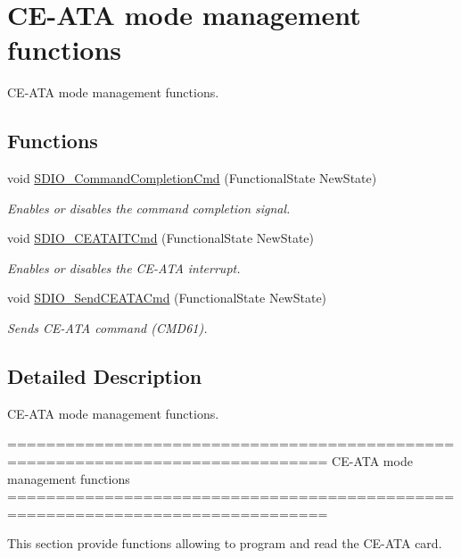 \hypertarget{group___s_d_i_o___group5}{}\section{C\+E-\/\+A\+T\+A mode management functions}
\label{group___s_d_i_o___group5}


C\+E-\/\+A\+T\+A mode management functions.  


\subsection*{Functions}
\begin{DoxyCompactItemize}
\item 
void \hyperlink{group___s_d_i_o___group5_ga1bbe98c629812bc62121d9c8b2c5e21b}{S\+D\+I\+O\+\_\+\+Command\+Completion\+Cmd} (Functional\+State New\+State)
\begin{DoxyCompactList}\small\item\em Enables or disables the command completion signal. \end{DoxyCompactList}\item 
void \hyperlink{group___s_d_i_o___group5_gab44b8cbc21be000a291563076159503b}{S\+D\+I\+O\+\_\+\+C\+E\+A\+T\+A\+I\+T\+Cmd} (Functional\+State New\+State)
\begin{DoxyCompactList}\small\item\em Enables or disables the C\+E-\/\+A\+T\+A interrupt. \end{DoxyCompactList}\item 
void \hyperlink{group___s_d_i_o___group5_ga8dc7f17804bdb745b42f6647c8487b4c}{S\+D\+I\+O\+\_\+\+Send\+C\+E\+A\+T\+A\+Cmd} (Functional\+State New\+State)
\begin{DoxyCompactList}\small\item\em Sends C\+E-\/\+A\+T\+A command (C\+M\+D61). \end{DoxyCompactList}\end{DoxyCompactItemize}


\subsection{Detailed Description}
C\+E-\/\+A\+T\+A mode management functions. 

\begin{DoxyVerb} ===============================================================================
              CE-ATA mode management functions
 ===============================================================================  

  This section provide functions allowing to program and read the CE-ATA card.\end{DoxyVerb}
 

